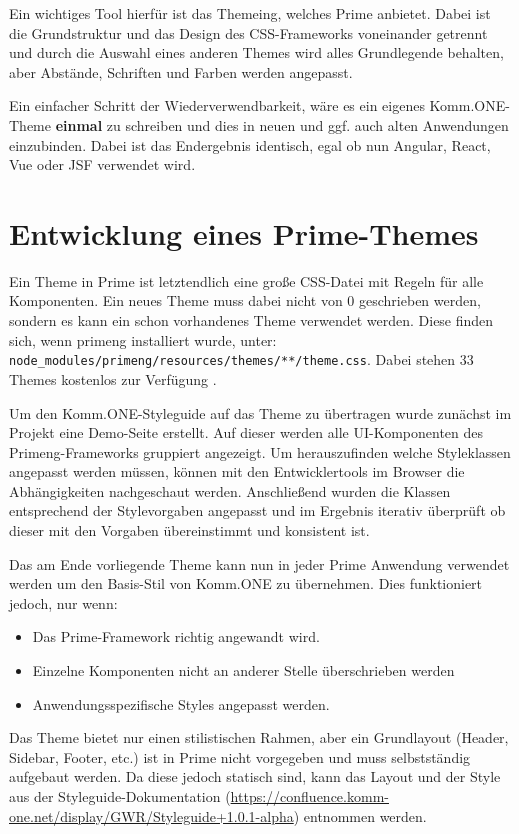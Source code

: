 Ein wichtiges Tool hierfür ist das Themeing, welches Prime anbietet. Dabei ist die Grundstruktur und das Design des CSS-Frameworks voneinander getrennt und durch die Auswahl eines anderen Themes wird alles Grundlegende behalten, aber Abstände, Schriften und Farben werden angepasst. 

Ein einfacher Schritt der Wiederverwendbarkeit, wäre es ein eigenes Komm.ONE-Theme \textbf{einmal} zu schreiben und dies in neuen und ggf. auch alten Anwendungen einzubinden. Dabei ist das Endergebnis identisch, egal ob nun Angular, React, Vue oder JSF verwendet wird.

\chapter{Entwicklung eines Prime-Themes}

Ein Theme in Prime ist letztendlich eine große CSS-Datei mit Regeln für alle Komponenten. Ein neues Theme muss dabei nicht von $0$ geschrieben werden, sondern es kann ein schon vorhandenes Theme verwendet werden. Diese finden sich, wenn primeng installiert wurde, unter: \lstinline|node_modules/primeng/resources/themes/**/theme.css|. Dabei stehen 33 Themes kostenlos zur Verfügung \cite{Primeng.20.01.2023}. 

Um den Komm.ONE-Styleguide auf das Theme zu übertragen wurde zunächst im Projekt eine Demo-Seite erstellt. Auf dieser werden alle UI-Komponenten des Primeng-Frameworks gruppiert angezeigt. Um herauszufinden welche Styleklassen angepasst werden müssen, können mit den Entwicklertools im Browser die Abhängigkeiten nachgeschaut werden. Anschließend wurden die Klassen entsprechend der Stylevorgaben angepasst und im Ergebnis iterativ überprüft ob dieser mit den Vorgaben übereinstimmt und konsistent ist. 

Das am Ende vorliegende Theme kann nun in jeder Prime Anwendung verwendet werden um den Basis-Stil von Komm.ONE zu übernehmen. Dies funktioniert jedoch, nur wenn:
\begin{itemize}
    \setlength\itemsep{-1em}
    \item Das Prime-Framework richtig angewandt wird.
    \item Einzelne Komponenten nicht an anderer Stelle überschrieben werden
    \item Anwendungsspezifische Styles angepasst werden. 
\end{itemize}

Das Theme bietet nur einen stilistischen Rahmen, aber ein Grundlayout (Header, Sidebar, Footer, etc.) ist in Prime nicht vorgegeben und muss selbstständig aufgebaut werden. Da diese jedoch statisch sind, kann das Layout und der Style aus der Styleguide-Dokumentation (\href{https://confluence.komm-one.net/display/GWR/Styleguide+1.0.1-alpha}{https://confluence.komm-one.net/display/GWR/Styleguide+1.0.1-alpha}) entnommen werden.
